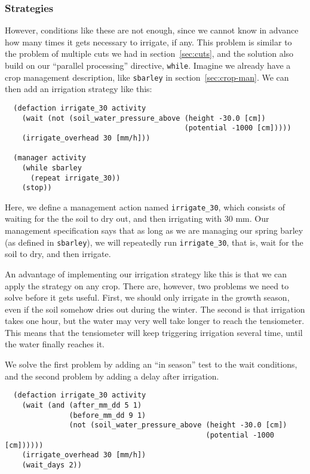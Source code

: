 \documentclass[a4paper,11pt]{article}
\begin{document}

\subsubsection{Strategies}

However, conditions like these are not enough, since we cannot know in
advance how many times it gets necessary to irrigate, if any.  This
problem is similar to the problem of multiple cuts we had in
section~\ref{sec:cuts}, and the solution also build on our ``parallel
processing'' directive, \texttt{while}.  Imagine we already have a
crop management description, like \texttt{sbarley} in
section~\ref{sec:crop-man}.  We can then add an irrigation strategy
like this:
\begin{verbatim}
  (defaction irrigate_30 activity 
    (wait (not (soil_water_pressure_above (height -30.0 [cm])
                                          (potential -1000 [cm]))))
    (irrigate_overhead 30 [mm/h]))

  (manager activity
    (while sbarley
      (repeat irrigate_30))
    (stop))
\end{verbatim}

Here, we define a management action named \texttt{irrigate\_30}, which
consists of waiting for the the soil to dry out, and then irrigating
with 30 mm.  Our management specification says that as long as we are
managing our spring barley (as defined in \texttt{sbarley}), we will
repeatedly run \texttt{irrigate\_30}, that is, wait for the soil to
dry, and then irrigate.

An advantage of implementing our irrigation strategy like this is
that we can apply the strategy on any crop.  There are, however, two
problems we need to solve before it gets useful.  First, we should only
irrigate in the growth season, even if the soil somehow dries out
during the winter.  The second is that irrigation takes one hour, but
the water may very well take longer to reach the tensiometer.  This
means that the tensiometer will keep triggering irrigation several
time, until the water finally reaches it.

We solve the first problem by adding an ``in season'' test to the wait
conditions, and the second problem by adding a delay after
irrigation. 
\begin{verbatim}
  (defaction irrigate_30 activity 
    (wait (and (after_mm_dd 5 1)
               (before_mm_dd 9 1)
               (not (soil_water_pressure_above (height -30.0 [cm])
                                               (potential -1000 [cm])))))
    (irrigate_overhead 30 [mm/h])
    (wait_days 2))
\end{verbatim}
\end{document}

